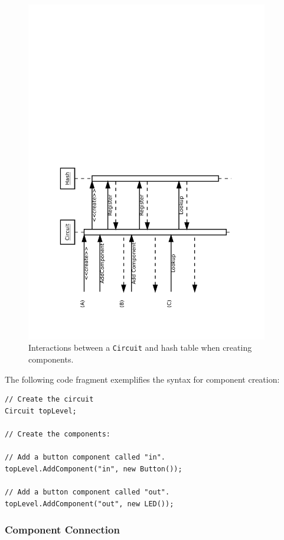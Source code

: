 \documentclass{article}
\newcommand{\ClassName}[1]{\texttt{#1}}
\begin{document}
\begin{figure}[H]
    \begin{center}
        \includegraphics[angle=270,width=300pt]{imgs/ComponentCreationInteraction.pdf}
    \end{center}
    \caption{Interactions between a \ClassName{Circuit} and hash table when creating components.}
\end{figure}

The following code fragment exemplifies the syntax for component creation:

\begin{lstlisting}
// Create the circuit
Circuit topLevel;

// Create the components:

// Add a button component called "in".
topLevel.AddComponent("in", new Button());

// Add a button component called "out".
topLevel.AddComponent("out", new LED());
\end{lstlisting}

\subsubsection{Component Connection}
\end{document}
